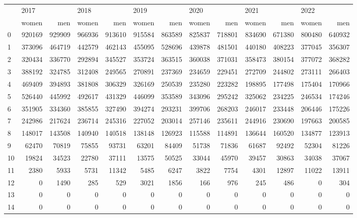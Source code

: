 \begin{tabular}{lrrrrrrrrrrrr}
\toprule
{} & \multicolumn{2}{l}{2017} & \multicolumn{2}{l}{2018} & \multicolumn{2}{l}{2019} & \multicolumn{2}{l}{2020} & \multicolumn{2}{l}{2021} & \multicolumn{2}{l}{2022} \\
{} &   women &     men &   women &     men &   women &     men &   women &     men &   women &     men &   women &     men \\
\midrule
0  &  920169 &  929909 &  966936 &  913610 &  915584 &  863589 &  825837 &  718801 &  834690 &  671380 &  800480 &  640932 \\
1  &  373096 &  464719 &  442579 &  462143 &  455095 &  528696 &  439878 &  481501 &  440180 &  408223 &  377045 &  356307 \\
2  &  320434 &  336770 &  292894 &  345527 &  353724 &  363515 &  360038 &  371031 &  358473 &  380154 &  377072 &  368282 \\
3  &  388192 &  324785 &  312408 &  249565 &  270891 &  237369 &  234659 &  229451 &  272709 &  244802 &  273111 &  266403 \\
4  &  469409 &  394893 &  381808 &  306329 &  326169 &  250539 &  235280 &  223282 &  198895 &  177498 &  175404 &  170966 \\
5  &  526440 &  445992 &  492617 &  431329 &  446099 &  353589 &  343096 &  295242 &  325062 &  234225 &  246534 &  174246 \\
6  &  351905 &  334360 &  385855 &  327490 &  394274 &  293231 &  399706 &  268203 &  246017 &  233448 &  206446 &  175226 \\
7  &  242986 &  217624 &  236714 &  245316 &  227052 &  203014 &  257146 &  235611 &  244916 &  230690 &  197663 &  200585 \\
8  &  148017 &  143508 &  140940 &  140518 &  138148 &  126923 &  115588 &  114891 &  136644 &  160520 &  134877 &  123913 \\
9  &   62470 &   70819 &   75855 &   93731 &   63201 &   84409 &   51738 &   71836 &   61687 &   92492 &   52304 &   81226 \\
10 &   19824 &   34523 &   22780 &   37111 &   13575 &   50525 &   33044 &   45970 &   39457 &   30863 &   34038 &   37067 \\
11 &    2380 &    5933 &    5731 &   11342 &    5485 &    6247 &    3822 &    7754 &    4301 &   12897 &   11022 &   13911 \\
12 &       0 &    1490 &     285 &     529 &    3021 &    1856 &     166 &     976 &     245 &     486 &       0 &     304 \\
13 &       0 &       0 &       0 &       0 &       0 &       0 &       0 &       0 &       0 &       0 &       0 &       0 \\
14 &       0 &       0 &       0 &       0 &       0 &       0 &       0 &       0 &       0 &       0 &       0 &       0 \\
\bottomrule
\end{tabular}
